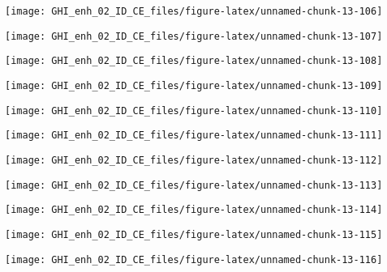 \documentclass[
  10pt,
  a4paper,oneside]{article}
\begin{document}
\begin{center}\texttt{[image: GHI\_enh\_02\_ID\_CE\_files/figure-latex/unnamed-chunk-13-106]} \end{center}

\begin{center}\texttt{[image: GHI\_enh\_02\_ID\_CE\_files/figure-latex/unnamed-chunk-13-107]} \end{center}

\begin{center}\texttt{[image: GHI\_enh\_02\_ID\_CE\_files/figure-latex/unnamed-chunk-13-108]} \end{center}

\begin{center}\texttt{[image: GHI\_enh\_02\_ID\_CE\_files/figure-latex/unnamed-chunk-13-109]} \end{center}

\begin{center}\texttt{[image: GHI\_enh\_02\_ID\_CE\_files/figure-latex/unnamed-chunk-13-110]} \end{center}

\begin{center}\texttt{[image: GHI\_enh\_02\_ID\_CE\_files/figure-latex/unnamed-chunk-13-111]} \end{center}

\begin{center}\texttt{[image: GHI\_enh\_02\_ID\_CE\_files/figure-latex/unnamed-chunk-13-112]} \end{center}

\begin{center}\texttt{[image: GHI\_enh\_02\_ID\_CE\_files/figure-latex/unnamed-chunk-13-113]} \end{center}

\begin{center}\texttt{[image: GHI\_enh\_02\_ID\_CE\_files/figure-latex/unnamed-chunk-13-114]} \end{center}

\begin{center}\texttt{[image: GHI\_enh\_02\_ID\_CE\_files/figure-latex/unnamed-chunk-13-115]} \end{center}

\begin{center}\texttt{[image: GHI\_enh\_02\_ID\_CE\_files/figure-latex/unnamed-chunk-13-116]} \end{center}
\end{document}

